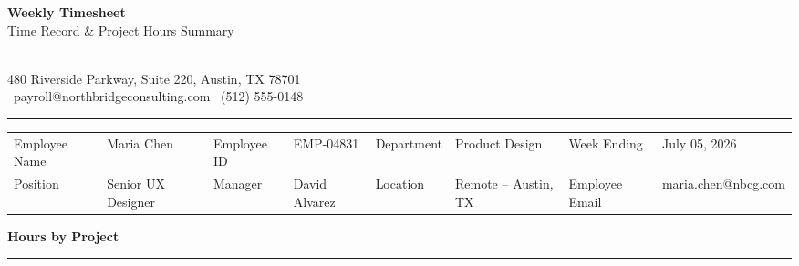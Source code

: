 \documentclass[11pt]{article}
\newcommand{\sectiontitle}[1]{%
  \par\vspace{4mm}
  {\color{accent}\bfseries\large #1}%
  \vspace{-1.5mm}
  \par{\color{accent}\rule{\linewidth}{0.6pt}}
  \vspace{2mm}
}
\begin{document}
\noindent
\begin{minipage}[t]{0.62\linewidth}
  {\color{accentdark}\fontsize{28}{30}\selectfont\bfseries Weekly Timesheet}\\[1mm]
  {\color{neutral}\large Time Record \& Project Hours Summary}
\end{minipage}%
\hfill
\begin{minipage}[t]{0.34\linewidth}
  \raggedleft
  \\[1mm]
  {\footnotesize\color{neutral} 480 Riverside Parkway, Suite 220, Austin, TX 78701\\
   \faEnvelope[regular]\ payroll@northbridgeconsulting.com \quad \faPhone\ (512) 555-0148}
\end{minipage}

\vspace{3mm}
{\color{accent}\rule{\linewidth}{1.4pt}}
\vspace{3mm}

\begin{tabularx}{\linewidth}{@{}K@{\hspace{3mm}}V@{\hspace{9mm}}K@{\hspace{3mm}}V@{\hspace{9mm}}K@{\hspace{3mm}}V@{\hspace{9mm}}K@{\hspace{3mm}}V@{}}
Employee Name & Maria Chen & Employee ID & EMP-04831 & Department & Product Design & Week Ending & July 05, 2026 \\
Position & Senior UX Designer & Manager & David Alvarez & Location & Remote -- Austin, TX & Employee Email & maria.chen@nbcg.com \\
\end{tabularx}

\sectiontitle{Hours by Project}
\end{document}
